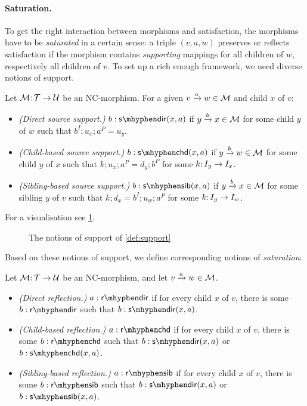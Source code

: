 \paragraph{Saturation.}

To get the right interaction between morphisms and satisfaction, the morphisms have to be \emph{saturated} in a certain sense: a triple $(v,a,w)$ preserves or reflects satisfaction if the morphism contains \emph{supporting} mappings for all children of $w$, respectively all children of $v$. To set up a rich enough framework, we need diverse notions of support.

\begin{definition}\label{def:support}
Let ${\mathcal{M}}{:}\, {\mathcal{T}}\rightarrow{\mathcal{U}}$ be an NC-morphism. For a given ${v}\xrightarrow{a}{w}\in{\mathcal{M}}$ and child $x$ of $v$:
\begin{itemize}[topsep=\smallskipamount]
\item \emph{(Direct source support.)} $\issdir b{x,a}$ if ${y}\xrightarrow{b}{x}\in{\mathcal{M}}$ for some child $y$ of $w$ such that $b^I;u_x;a^P=u_y$.
\item \emph{(Child-based source support.)} $\isschd b{x,a}$ if ${y}\xrightarrow{b}{w}\in{\mathcal{M}}$ for some child $y$ of $x$ such that $k;u_x;a^P=d_y;b^P$ for some $k{:}\, I_y\rightarrow I_x$.
\item \emph{(Sibling-based source support.)} $\isssib b{x,a}$ if ${y}\xrightarrow{b}{x}\in{\mathcal{M}}$ for some sibling $y$ of $v$ such that $k;d_x=b^I;u_w;a^P$ for some $k{:}\, I_y\rightarrow I_w$.
\end{itemize}
\end{definition}
%
For a visualisation see \cref{fig:source-saturation}.
%
\begin{figure}
	
	\caption{The notions of support of \cref{def:support}}
	\label{fig:source-saturation}
\end{figure}
%
Based on these notions of support, we define corresponding notions of \emph{saturation}:

\begin{definition}\label{def:syntactic reflection}
Let ${\mathcal{M}}{:}\, {\mathcal{T}}\rightarrow{\mathcal{U}}$ be an NC-morphism, and let ${v}\xrightarrow{a}{w}\in{\mathcal{M}}$.
\begin{itemize}[topsep=\smallskipamount]
\item \emph{(Direct reflection.)} $a:\rdir$ if for every child $x$ of $v$, there is some $b:\rdir$ such that $\issdir b{x,a}$.
\item \emph{(Child-based reflection.)} $a:\rchd$ if for every child $x$ of $v$, there is some $b:\rchd$ such that $\issdir b{x,a}$ or $\isschd b{x,a}$.
\item \emph{(Sibling-based reflection.)} $a:\rsib$ if for every child $x$ of $v$, there is some $b:\rsib$ such that $\issdir b{x,a}$ or $\isssib b{x,a}$.
\end{itemize}
\end{definition}

